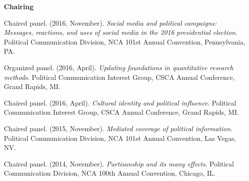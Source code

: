 {\large\textbf{Chairing}} \vspace{.5em}

  \begin{bibenum}
    \item[] Chaired panel. (2016, November).
      \textit{Social media and political campaigns: Messages, reactions, and uses of social media in the 2016 presidential election}.
      Political Communication Division, NCA 101st Annual Convention, Pennsylvania, PA.

    \item[] Organized panel. (2016, April).
      \textit{Updating foundations in quantitative research methods}.
      Political Communication Interest Group, CSCA Annual Conference, Grand Rapids, MI.

    \item[] Chaired panel. (2016, April).
      \textit{Cultural identity and political influence}.
      Political Communication Interest Group, CSCA Annual Conference, Grand Rapids, MI.

    \item[] Chaired panel. (2015, November).
      \textit{Mediated coverage of political information}.
      Political Communication Division, NCA 101st Annual Convention, Las Vegas, NV.

    \item[] Chaired panel. (2014, November).
      \textit{Partisanship and its many effects}.
      Political Communication Division, NCA 100th Annual Convention, Chicago, IL.
  \end{bibenum}

\vspace{1em}
